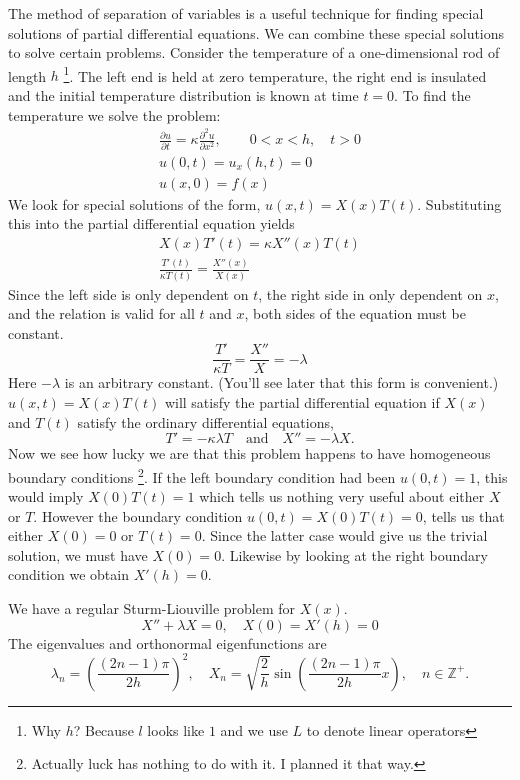 The method of separation of variables is a useful technique for 
finding special solutions of partial differential equations. 
We can combine these special solutions to solve certain problems.
Consider the temperature of a one-dimensional rod of length $h$
\footnote{Why $h$?  Because $l$ looks like $1$ and we use $L$ to denote 
  linear operators}.
The left end is held at zero temperature, the right end is insulated and 
the initial temperature distribution is known at time $t = 0$.  To find
the temperature we solve the problem:
\begin{gather*}
  \frac{\partial u}{\partial t} = \kappa \frac{\partial^2 u}{\partial x^2}, \qquad 0 < x < h,\quad t > 0 \\
  u(0,t) = u_x(h,t) = 0 \\
  u(x,0) = f(x)
\end{gather*}
We look for special solutions of the form, $ u(x,t) = X(x) T(t).$
Substituting this into the partial differential equation yields
\begin{gather*}
  X(x) T'(t) = \kappa X''(x) T(t) \\
  \frac{T'(t)}{\kappa T(t)} = \frac{X''(x)}{X(x)}
\end{gather*}
Since the left side is only dependent on $t$, the right side in only dependent
on $x$, and the relation is valid for all $t$ and $x$, both sides of the
equation must be constant.
\[ 
\frac{T'}{\kappa T} = \frac{X''}{X} = - \lambda
\]
Here $-\lambda$ is an arbitrary constant.  (You'll see later that this form 
is convenient.)  $u(x,t) = X(x) T(t)$ will satisfy the partial differential
equation if $X(x)$ and $T(t)$ satisfy the ordinary differential equations,
\[ 
T' = -\kappa \lambda T 
\quad \mathrm{and}\quad 
X'' = -\lambda X. 
\]
Now we see how lucky we are that this problem happens to have homogeneous
boundary conditions
\footnote{Actually luck has nothing to do with it. I planned
  it that way.}.
If the left boundary condition had been $u(0,t) = 1$, this
would imply $X(0)T(t) = 1$ which tells us nothing very useful about either
$X$ or $T$.  However the boundary condition $u(0,t) = X(0)T(t)= 0$, tells 
us that either $X(0) = 0$ or $T(t) = 0$.  Since the latter case would give us 
the trivial solution, we must have $X(0) = 0$.  Likewise by looking at the 
right boundary condition we obtain $X'(h) = 0$.


We have a regular Sturm-Liouville problem for $X(x)$.
\[ 
X'' + \lambda X = 0,\quad X(0) = X'(h) = 0 
\]
The eigenvalues and orthonormal eigenfunctions are
\[
\lambda_n = \left( \frac{(2n-1) \pi}{2 h} \right)^2, \quad
X_n = \sqrt{ \frac{2}{h} } \sin \left( \frac{(2n-1) \pi}{2 h} x \right), \quad
n \in \mathbb{Z}^+.
\]

